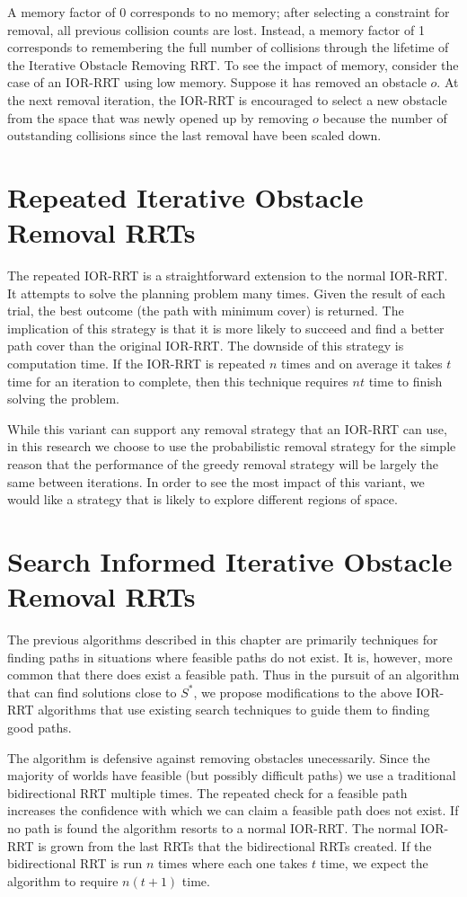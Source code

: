 A memory factor of 0 corresponds to no memory; after selecting a constraint for removal, all previous collision counts are lost. Instead, a memory factor of 1 corresponds to remembering the full number of collisions through the lifetime of the Iterative Obstacle Removing RRT. To see the impact of memory, consider the case of an IOR-RRT using low memory. Suppose it has removed an obstacle $o$. At the next removal iteration, the IOR-RRT is encouraged to select a new obstacle from the space that was newly opened up by removing $o$ because the number of outstanding collisions since the last removal have been scaled down. 

\section{Repeated Iterative Obstacle Removal RRTs}
The repeated IOR-RRT is a straightforward extension to the normal IOR-RRT. It attempts to solve the planning problem many times. Given the result of each trial, the best outcome (the path with minimum cover) is returned. The implication of this strategy is that it is more likely to succeed and find a better path cover than the original IOR-RRT. The downside of this strategy is computation time. If the IOR-RRT is repeated $n$ times and on average it takes $t$ time for an iteration to complete, then this technique requires $nt$ time to finish solving the problem.

While this variant can support any removal strategy that an IOR-RRT can use, in this research we choose to use the probabilistic removal strategy for the simple reason that the performance of the greedy removal strategy will be largely the same between iterations. In order to see the most impact of this variant, we would like a strategy that is likely to explore different regions of space.

\section{Search Informed Iterative Obstacle Removal RRTs}
The previous algorithms described in this chapter are primarily techniques for finding paths in situations where feasible paths do not exist. It is, however, more common that there does exist a feasible path. Thus in the pursuit of an algorithm that can find solutions close to $S^{*}$, we propose modifications to the above IOR-RRT algorithms that use existing search techniques to guide them to finding good paths.

The algorithm is defensive against removing obstacles unecessarily. Since the majority of worlds have feasible (but possibly difficult paths) we use a traditional bidirectional RRT multiple times. The repeated check for a feasible path increases the confidence with which we can claim a feasible path does not exist. If no path is found the algorithm resorts to a normal IOR-RRT. The normal IOR-RRT is grown from the last RRTs that the bidirectional RRTs created. If the bidirectional RRT is run $n$ times where each one takes $t$ time, we expect the algorithm to require $n(t+1)$ time. 

